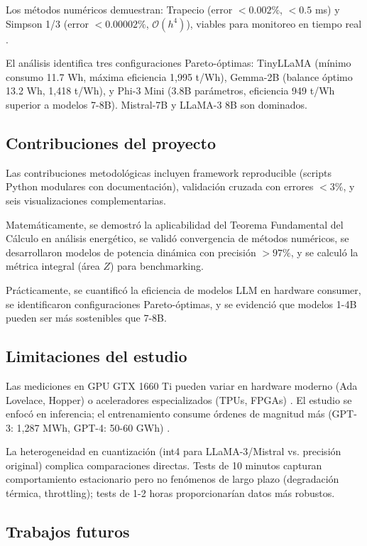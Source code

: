 Los métodos numéricos demuestran: Trapecio (error $< 0.002\%$, $< 0.5$ ms) y Simpson 1/3 (error $< 0.00002\%$, $\mathcal{O}(h^4)$), viables para monitoreo en tiempo real \cite{girija2024ai}.

El análisis identifica tres configuraciones Pareto-óptimas: TinyLLaMA (mínimo consumo 11.7 Wh, máxima eficiencia 1,995 t/Wh), Gemma-2B (balance óptimo 13.2 Wh, 1,418 t/Wh), y Phi-3 Mini (3.8B parámetros, eficiencia 949 t/Wh superior a modelos 7-8B). Mistral-7B y LLaMA-3 8B son dominados.

\subsection{Contribuciones del proyecto}

Las contribuciones metodológicas incluyen framework reproducible (scripts Python modulares con documentación), validación cruzada con errores $< 3\%$, y seis visualizaciones complementarias.

Matemáticamente, se demostró la aplicabilidad del Teorema Fundamental del Cálculo en análisis energético, se validó convergencia de métodos numéricos, se desarrollaron modelos de potencia dinámica con precisión $> 97\%$, y se calculó la métrica integral (área $Z$) para benchmarking.

Prácticamente, se cuantificó la eficiencia de modelos LLM en hardware consumer, se identificaron configuraciones Pareto-óptimas, y se evidenció que modelos 1-4B pueden ser más sostenibles que 7-8B.

\subsection{Limitaciones del estudio}

Las mediciones en GPU GTX 1660 Ti pueden variar en hardware moderno (Ada Lovelace, Hopper) o aceleradores especializados (TPUs, FPGAs) \cite{jouppi2023tpu}. El estudio se enfocó en inferencia; el entrenamiento consume órdenes de magnitud más (GPT-3: 1,287 MWh, GPT-4: 50-60 GWh) \cite{tabbakh2024sustainable, chatterjee2025energy, greensoftware2025position}.

La heterogeneidad en cuantización (int4 para LLaMA-3/Mistral vs. precisión original) complica comparaciones directas. Tests de 10 minutos capturan comportamiento estacionario pero no fenómenos de largo plazo (degradación térmica, throttling); tests de 1-2 horas proporcionarían datos más robustos.

\subsection{Trabajos futuros}

